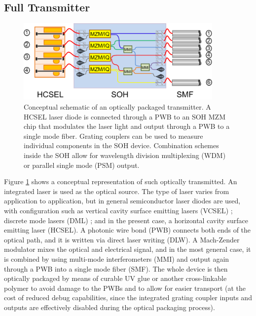 \subsection{Full Transmitter}
\begin{figure}[!ht]
\centering
  \includegraphics[width=0.9\textwidth]{visio/Concept}
  \caption{Conceptual schematic of an optically packaged transmitter. A HCSEL laser diode is connected through a PWB to an SOH MZM chip that modulates the laser light and output through a PWB to a single mode fiber. Grating couplers can be used to measure individual components in the SOH device. Combination schemes inside the SOH allow for wavelength division multiplexing (WDM) or parallel single mode (PSM) output.}
  \label{fig:concept}
\end{figure}

Figure \ref{fig:concept} shows a conceptual representation of such optically transmitted. An integrated laser is used as the optical source. The type of laser varies from application to application, but in general semiconductor laser diodes are used, with configuration such as vertical cavity surface emitting lasers (VCSEL) \cite{IntPWBPetek16}; discrete mode lasers (DML) \cite{SOHPajkovic16}; and in the present case, a horizontal cavity surface emitting laser (HCSEL). A photonic wire bond (PWB) connects both ends of the optical path, and it is written via direct laser writing (DLW). A Mach-Zender modulator mixes the optical and electrical signal, and in the most general case, it is combined by using multi-mode interferometers (MMI) and output again through a PWB into a single mode fiber (SMF). The whole device is then optically packaged by means of curable UV glue or another cross-linkable polymer to avoid damage to the PWBs and to allow for easier transport (at the cost of reduced debug capabilities, since the integrated grating coupler inputs and outputs are effectively disabled during the optical packaging process).

